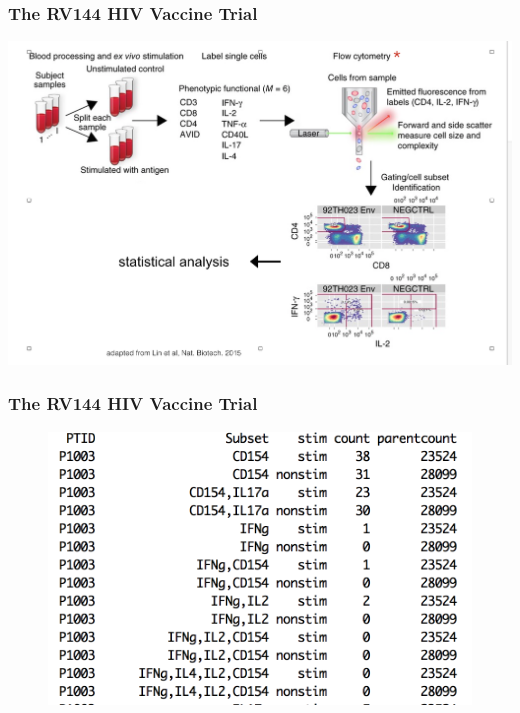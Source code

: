 \documentclass{beamer}
\theoremstyle{definition}
\begin{document}

\begin{frame}
\frametitle{The RV144 HIV Vaccine Trial}
\begin{center}
\includegraphics[scale=0.4]{figures/flowcytintro}
\end{center}
\end{frame}



\begin{frame}
\frametitle{The RV144 HIV Vaccine Trial}
\begin{figure}[]
\includegraphics[width=12 cm]{figures/datasetExample} \caption{}
\end{figure}
\end{frame}

\end{document}
